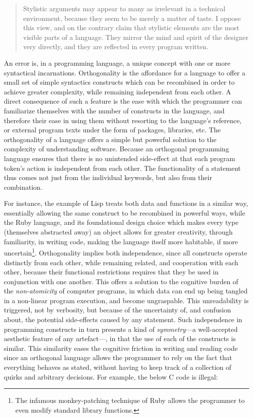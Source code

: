 \begin{quote}
  Stylistic arguments may appear to many as irrelevant in a technical environment, because they seem to be merely a matter of taste. I oppose this view, and on the contrary claim that stylistic elements are the most visible parts of a language. They mirror the mind and spirit of the designer very directly, and they are reflected in every program written. \citep{wirth_essence_2003}
\end{quote}

An error is, in a programming language, a unique concept with one or more syntactical incarnations. Orthogonality is the affordance for a language to offer a small set of simple syntactics constructs which can be recombined in order to achieve greater complexity, while remaining independent from each other. A direct consequence of such a feature is the ease with which the programmer can familiarize themselves with the number of constructs in the language, and therefore their ease in using them without resorting to the language's reference, or external program texts under the form of packages, libraries, etc. The orthogonality of a language offers a simple but powerful solution to the complexity of understanding software. Because an orthogonal programming language ensures that there is no unintended side-effect at that each program token's action is independent from each other. The functionality of a statement thus comes not just from the individual keywords, but also from their combination.

For instance, the example of Lisp treats both data and functions in a similar way, essentially allowing the same construct to be recombined in powerful ways, while the Ruby language, and its foundational design choice which makes every type (themselves abstracted away) an object allows for greater creativity, through familiarity, in writing code, making the language itself more habitable, if more uncertain\footnote{The infamous monkey-patching technique of Ruby allows the programmer to even modify standard library functions.}. Orthogonality implies both independence, since all constructs operate distinctly from each other, while remaining related, and cooperation with each other, because their functional restrictions requires that they be used in conjunction with one another. This offers a solution to the cognitive burden of the \emph{non-atomicity} of computer programs, in which data can end up being tangled in a non-linear program execution, and become ungraspable. This unreadability is triggered, not by verbosity, but because of the uncertainty of, and confusion about, the potential side-effects caused by any statement. Such independence in programming constructs in turn presents a kind of \emph{symmetry}—a well-accepted aesthetic feature of any artefact—, in that the use of each of the constructs is similar. This similarity eases the cognitive friction in writing and reading code since an orthogonal language allows the programmer to rely on the fact that everything behaves as stated, without having to keep track of a collection of quirks and arbitrary decisions. For example, the below C code is illegal:

